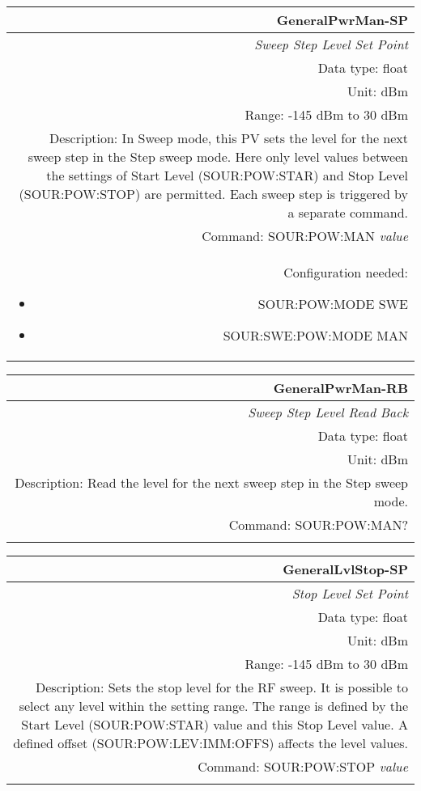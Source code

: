 \documentclass[openany]{article}
\begin{document}
		\begin{tabular}{N}
			\hline
			\bfseries GeneralPwrMan-SP \\ \hline
			\emph{Sweep Step Level Set Point} \\
			Data type: float \\
			Unit: dBm \\
			Range: -145 dBm to 30 dBm \\
			Description: In Sweep mode, this PV sets the level for the next sweep step in the Step sweep mode. Here only level values between the settings of  Start Level (SOUR:POW:STAR) and Stop Level (SOUR:POW:STOP) are permitted. Each sweep step is triggered by a separate command. \\
			Command: SOUR:POW:MAN \emph{value} \\
			Configuration needed:
				\begin{itemize}[noitemsep]
				\small
				\item[] SOUR:POW:MODE SWE
				\item[] SOUR:SWE:POW:MODE MAN
				\end{itemize} \\

		\end{tabular}


		\begin{tabular}{N}
			\hline
			\bfseries GeneralPwrMan-RB \\ \hline
			\emph{Sweep Step Level Read Back} \\
			Data type: float \\
			Unit: dBm \\
			Description: Read the level for the next sweep step in the Step sweep mode. \\
			Command: SOUR:POW:MAN? \\
			\\

		\end{tabular}


		\begin{tabular}{N}
			\hline
			\bfseries GeneralLvlStop-SP \\ \hline
			\emph{Stop Level Set Point} \\
			Data type: float \\
			Unit: dBm \\
			Range: -145 dBm to 30 dBm \\
			Description: Sets the stop level for the RF sweep. It is possible to select any level within the setting range. The range is defined by the Start Level (SOUR:POW:STAR) value and this Stop Level value. A defined offset (SOUR:POW:LEV:IMM:OFFS) affects the level values. \\
			Command: SOUR:POW:STOP \emph{value} \\
			\\

		\end{tabular}
\end{document}
